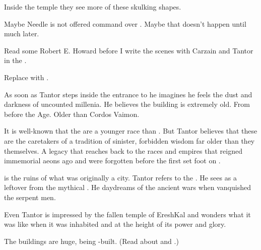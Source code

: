 \begin{changes}
    Inside the temple they see more of these skulking shapes. 


  
  \begin{comment}\paragraph{A Dark Angel's Gift}\end{comment}
    Maybe Needle is not offered command over \banes. 
    Maybe that doesn't happen until much later. 
  
  \begin{comment}\paragraph{The Gods of \EreshKal}\end{comment}
    
    Read some Robert E. Howard before I write the scenes with Carzain and Tantor in the \wylde. 
    
    Replace  with . 
    
    As soon as Tantor steps inside the entrance to \EreshKal{} he imagines he feels the dust and darkness of uncounted millenia. 
    He believes the building is extremely old. 
    From before the \Human{} Age. 
    Older than Cordos Vaimon. 
    
    It is well-known that the \meccara{} are a younger race than \humans. 
    But Tantor believes that these \EreshKali{} are the caretakers of a tradition of sinister, forbidden wisdom far older than they themselves. 
    A legacy that reaches back to the races and empires that reigned immemorial aeons ago and were forgotten before the first \humans{} set foot on \Miith. 
    
    \EreshKal{} is the ruins of what was originally a \quiljaaran{} city. 
    Tantor refers to the . 
    He sees \EreshKal{} as a leftover from the mythical . 
    He daydreams of the ancient wars when \humans{} vanquished the serpent men. 

    Even \Jirad Tantor is impressed by the fallen temple of EreshKal and wonders what it was like when it was inhabited and at the height of its power and glory.
    
    The buildings are huge, being \quiljaaran-built. 
    (Read about  and .) 


\end{changes}
